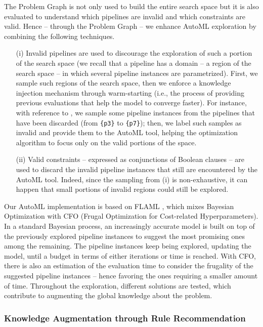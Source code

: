 The Problem Graph is not only used to build the entire search space but it is also evaluated to understand which pipelines are invalid and which constraints are valid.
Hence -- through the Problem Graph -- we enhance AutoML exploration by combining the following techniques.
\begin{itemize}
    \item[(i)] Invalid pipelines are used to discourage the exploration of such a portion of the search space (we recall that a pipeline has a domain -- a region of the search space -- in which several pipeline instances are parametrized).
    First, we sample such regions of the search space, then we enforce a knowledge injection mechanism through warm-starting (i.e., the process of providing previous evaluations that help the model to converge faster).
    For instance, with reference to , we sample some pipeline instances from the pipelines that have been discarded (from \texttt{\{p3\}} to \texttt{\{p7\}});
    then, we label such samples as invalid and provide them to the AutoML tool, helping the optimization algorithm to focus only on the valid portions of the space.
    \item[(ii)] Valid constraints -- expressed as conjunctions of Boolean clauses -- are used to discard the invalid pipeline instances that still are encountered by the AutoML tool.
    Indeed, since the sampling from (i) is non-exhaustive, it can happen that small portions of invalid regions could still be explored.
\end{itemize}

Our AutoML implementation is based on FLAML \cite{wang2021flaml}, which mixes Bayesian Optimization with CFO (Frugal Optimization for Cost-related Hyperparameters).
In a standard Bayesian process, an increasingly accurate model is built on top of the previously explored pipeline instances to suggest the most promising ones among the remaining.
The pipeline instances keep being explored, updating the model, until a budget in terms of either iterations or time is reached.
With CFO, there is also an estimation of the evaluation time to consider the frugality of the suggested pipeline instances -- hence favoring the ones requiring a smaller amount of time.
Throughout the exploration, different solutions are tested, which contribute to augmenting the global knowledge about the problem.

\subsubsection{Knowledge Augmentation through Rule Recommendation}

